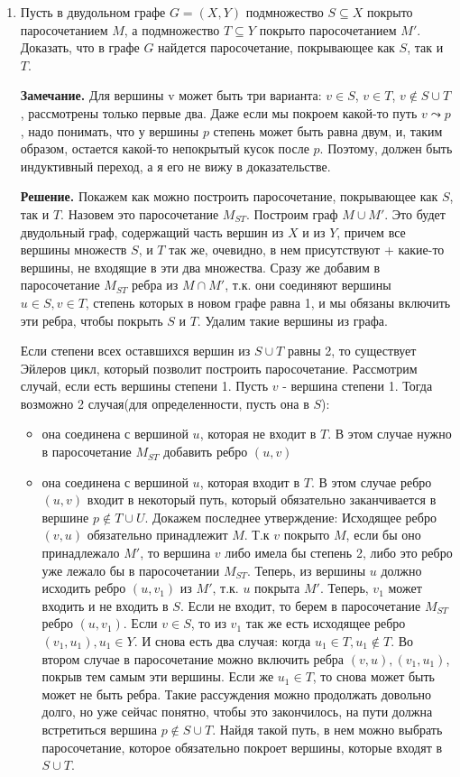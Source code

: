 \documentclass[fleqn]{article}
\begin{document}
	\begin{enumerate}
	\item Пусть в двудольном графе $G = (X, Y)$ подмножество $S \subseteq X$ покрыто паросочетанием $M$, а подмножество $T \subseteq Y$ покрыто паросочетанием $M'$. Доказать, что в графе $G$ найдется паросочетание, покрывающее как $S$, так и $T$.
	
	\textbf{Замечание.} Для вершины v может быть три варианта: $v \in S$, $v \in T$, $v \notin S \cup T$, рассмотрены только первые два.
	Даже если мы покроем какой-то путь $v \leadsto p$, надо понимать, что $у$ вершины $p$ степень может быть равна двум, и, таким образом, остается какой-то непокрытый кусок после $p$. Поэтому, должен быть индуктивный переход, а я его не вижу в доказательстве.
	
	\textbf{Решение.} Покажем как можно построить паросочетание, покрывающее как $S$, так и $T$. Назовем это паросочетание $M_{ST}$. Построим граф $M \cup M'$. Это будет двудольный граф, содержащий часть вершин из $X$ и из $Y$, причем все вершины множеств $S$, и $T$ так же, очевидно, в нем присутствуют + какие-то вершины, не входящие в эти два множества. Сразу же добавим в паросочетание $M_{ST}$ ребра из $M\cap M'$, т.к. они соединяют вершины $u \in S, v \in T$, степень которых в новом графе равна 1, и мы обязаны включить эти ребра, чтобы покрыть $S$ и $T$. Удалим такие вершины из графа. 
	 
	 Если степени всех оставшихся вершин из $S \cup T$ равны 2, то существует Эйлеров цикл, который позволит построить паросочетание. Рассмотрим случай, если есть вершины степени 1. Пусть $v$ - вершина степени 1. Тогда возможно 2 случая(для определенности, пусть она в $S$): 
	 \begin{itemize}
	 	\item она соединена с вершиной $u$, которая не входит в $T$. В этом случае нужно в паросочетание $M_{ST}$ добавить ребро $(u,v)$
	 	\item она соединена с вершиной $u$, которая входит в $T$. В этом случае ребро $(u,v)$ входит в некоторый путь, который обязательно заканчивается в вершине $p \notin T\cup U$. Докажем последнее утверждение: Исходящее ребро $(v,u)$ обязательно принадлежит $M$. Т.к $v$ покрыто $M$, если бы оно принадлежало $M'$, то вершина $v$ либо имела бы степень 2, либо это ребро уже лежало бы в паросочетании $M_{ST}$. Теперь, из вершины $u$ должно исходить ребро $(u, v_1)$ из $M'$, т.к. $u$ покрыта $M'$. Теперь, $v_1$ может входить и не входить в $S$. Если не входит, то берем в паросочетание $M_{ST}$ ребро $(u,v_1)$. Если $v \in S$, то из $v_1$ так же есть исходящее ребро $(v_1, u_1), u_1 \in Y$. И снова есть два случая: когда $u_1 \in T, u_1 \notin T$. Во втором случае в паросочетание можно включить ребра $(v,u), (v_1, u_1)$, покрыв тем самым эти вершины. Если же $u_1 \in T$, то снова может быть может не быть ребра. Такие рассуждения можно продолжать довольно долго, но уже сейчас понятно, чтобы это закончилось, на пути должна встретиться вершина $p\notin S\cup T$. Найдя такой путь, в нем можно выбрать паросочетание, которое обязательно покроет вершины, которые входят в $S\cup T$.
	 	

\end{itemize}
\end{enumerate}
\end{document}
